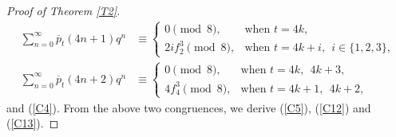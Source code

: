 \documentclass[12pt,reqno,a4paper]{amsart}
\numberwithin{equation}{section}
\begin{document}
\begin{proof}[Proof of Theorem \ref{T2}]
\begin{align*}
  \sum_{n=0}^\infty\overline{p}_{t}(4n+1)q^n &\equiv 
  \begin{cases}
0 \pmod{8},&\text{when $t=4k$,}\\
2if_2^3\pmod{8}, &\text{when $t=4k+i, ~~i\in\{1, 2, 3\}$,}
  \end{cases}\\
 \sum_{n=0}^\infty\overline{p}_{t}(4n+2)q^n &\equiv 
  \begin{cases}
0 \pmod{8},&\text{when $t=4k,~~4k+3$,}\\
4f_4^3\pmod{8}, &\text{when $t=4k+1, ~~4k+2$,}
  \end{cases}
  \end{align*}
  and (\ref{C4}). From the above two congruences,  we derive (\ref{C5}), (\ref{C12}) and (\ref{C13}). 
  \end{proof}
\end{document}
